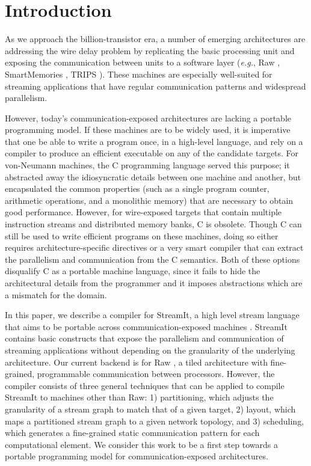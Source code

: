 \section{Introduction}

As we approach the billion-transistor era, a number of emerging
architectures are addressing the wire delay problem by replicating the
basic processing unit and exposing the communication between units to
a software layer ({\it e.g.}, Raw \cite{raw}, SmartMemories
\cite{smartmemories}, TRIPS \cite{trips}).  These machines are
especially well-suited for streaming applications that have regular
communication patterns and widespread parallelism.

However, today's communication-exposed architectures are lacking a
portable programming model.  If these machines are to be widely used,
it is imperative that one be able to write a program once, in a
high-level language, and rely on a compiler to produce an efficient
executable on any of the candidate targets. For von-Neumann machines,
the C programming language served this purpose; it abstracted away the
idiosyncratic details between one machine and another, but
encapsulated the common properties (such as a single program counter,
arithmetic operations, and a monolithic memory) that are necessary to
obtain good performance.  However, for wire-exposed targets that
contain multiple instruction streams and distributed memory banks, C
is obsolete.  Though C can still be used to write efficient programs
on these machines, doing so either requires architecture-specific
directives or a very smart compiler that can extract the parallelism
and communication from the C semantics.  Both of these options
disqualify C as a portable machine language, since it fails to hide
the architectural details from the programmer and it imposes
abstractions which are a mismatch for the domain.

In this paper, we describe a compiler for StreamIt, a high level
stream language that aims to be portable across communication-exposed
machines \cite{streamitcc}.  StreamIt contains basic constructs that
expose the parallelism and communication of streaming applications
without depending on the granularity of the underlying architecture.
Our current backend is for Raw \cite{raw}, a tiled architecture with
fine-grained, programmable communication between processors.  However,
the compiler consists of three general techniques that can be applied
to compile StreamIt to machines other than Raw: 1) partitioning, which
adjusts the granularity of a stream graph to match that of a given
target, 2) layout, which maps a partitioned stream graph to a given
network topology, and 3) scheduling, which generates a fine-grained
static communication pattern for each computational element.  We
consider this work to be a first step towards a portable programming
model for communication-exposed architectures.


